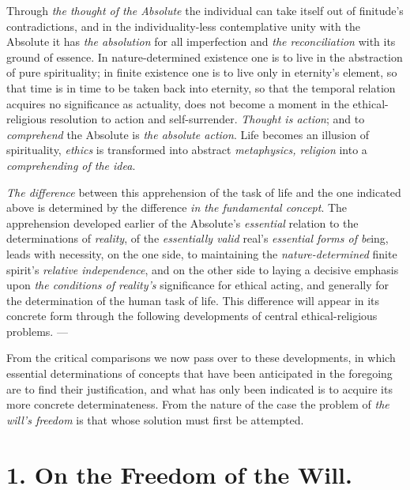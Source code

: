 \documentclass[12pt,a4paper]{book}
\begin{document}
Through \emph{the thought of the Absolute} the individual can take itself out
of finitude's contradictions, and in the individuality-less contemplative unity
with the Absolute it has \emph{the absolution} for all imperfection and
\emph{the reconciliation} with its ground of essence. In nature-determined
existence one is to live in the abstraction of pure spirituality; in finite
existence one is to live only in eternity's element, so that time is in time to
be taken back into eternity, so that the temporal relation acquires no
significance as actuality, does not become a moment in the ethical-religious
resolution to action and self-surrender. \emph{Thought is action}; and to
\emph{comprehend} the Absolute is \emph{the absolute action}. Life becomes an
illusion of spirituality, \emph{ethics} is transformed into abstract
\emph{metaphysics, religion} into a \emph{comprehending of the idea}.

\emph{The difference} between this apprehension of the task of life and the one
indicated above is determined by the difference \emph{in the fundamental
concept}. The apprehension developed earlier of the Absolute's
\emph{essential} relation to the determinations of \emph{reality}, of the
\emph{essentially valid} real's \emph{essential forms of be}ing, leads with
necessity, on the one side, to maintaining the \emph{nature-determined} finite
spirit's \emph{relative independence}, and on the other side to laying a
decisive emphasis upon \emph{the conditions of reality's}
significance for ethical acting, and generally for the determination of the
human task of life. This difference will appear in its concrete form through
the following developments of central ethical-religious problems. ---

From the critical comparisons we now pass over to these developments, in which
essential determinations of concepts that have been anticipated in the
foregoing are to find their justification, and what has only been indicated is
to acquire its more concrete determinateness. From the nature of the case the
problem of \emph{the will's freedom} is that whose solution must first be
attempted.

\section*{1. On the Freedom of the Will.}
\end{document}

